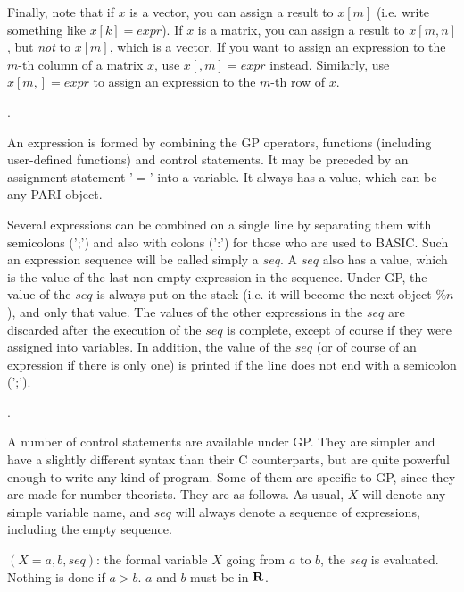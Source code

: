 Finally, note that if $x$ is a vector, you can assign a result to $x[m]$ (i.e. write
something like $x[k]=expr$). If $x$ is a matrix, you can assign a result to $x[m,n]$, but {\sl not} to $x[m]$, which is a vector. If you want to assign an
expression to the $m$-th column of a matrix $x$, use $x[,m]=expr$ instead. Similarly, use $x[m,]=expr$ to assign an expression to the $m$-th row of $x$.


.

An expression is formed by combining the GP operators, functions (including user-defined
functions) and control statements. It may be preceded by an assignment statement '$=$'
into a variable. It always has a value, which can be any PARI object.

Several expressions can be combined on a single line by separating them with semicolons
(';') and also with colons (':') for those who are used to BASIC. Such an expression
sequence will be called simply a $seq$. A $seq$ also has a value, which is the value
of the last non-empty expression in the sequence. Under GP, the value of the $seq$ is
always put on the stack (i.e. it will become the next object $\%n$), and only that value.
The values of the other expressions in the $seq$ are discarded after the execution of
the $seq$ is complete, except of course if they were assigned into variables.
In addition, the value of the $seq$ (or of course of an expression if there is only one)
is printed if the line does not end with a semicolon (';').

.

A number of control statements are available under GP. They are simpler and have a
slightly different syntax than their C counterparts, but are quite powerful enough
to write any kind of program. Some of them are specific to GP, since they are made
for number theorists. They are as follows. As usual, $X$ will denote any simple variable
name, and $seq$ will always denote a sequence of expressions, including the empty
sequence.

$(X=a,b,seq)$: the formal variable $X$ going from $a$ to $b$,
the $seq$ is evaluated. Nothing is done if $a>b$. $a$ and $b$ must be in $\Bbb R$.

